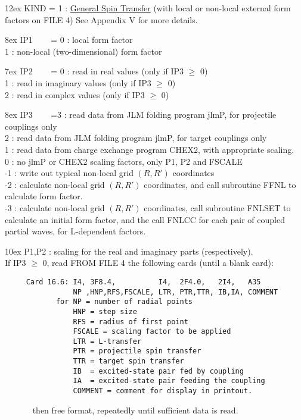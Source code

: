 \documentclass[11pt]{article}
\begin{document}
\hangindent 12ex
KIND = 1 :
\underline{General Spin Transfer}
(with local or non-local external form factors on FILE 4)
See Appendix V for more details.

\hangindent 8ex  IP1
~~~  = 0 : local form factor
\\   1 : non-local (two-dimensional) form factor



\hangindent 7ex  IP2
~~~  = 0 : read in real values      (only if IP3 $\geq$ 0)
\\   1 : read in imaginary values    (only if IP3 $\geq$ 0)
\\   2 : read in complex values        (only if IP3 $\geq$ 0)



\hangindent 8ex  IP3
~~~  =3 : read data from JLM folding program jlmP, for projectile couplings only
\\  2 : read data from JLM folding program jlmP, for target couplings only
\\   1 : read data from charge exchange program CHEX2, with appropriate scaling.
\\   0 : no jlmP or CHEX2 scaling factors, only P1, P2 and FSCALE
\\  -1 : write out typical non-local grid $(R,R')$ coordinates
\\  -2 : calculate non-local grid $(R,R')$ coordinates,
and call subroutine FFNL to calculate form factor.
\\  -3 : calculate non-local grid $(R,R')$ coordinates,
call subroutine FNLSET to calculate an initial form factor, and the call
FNLCC for each pair of coupled partial waves, for L-dependent factors.



\hangindent 10ex
 P1,P2 : scaling for the real and imaginary parts (respectively).\\

   If IP3 $\geq$  0, read FROM FILE 4 the following cards
   (until a blank card):
\begin{verbatim}
     Card 16.6: I4, 3F8.4,          I4,  2F4.0,   2I4,   A35
                NP ,HNP,RFS,FSCALE, LTR, PTR,TTR, IB,IA, COMMENT
            for NP = number of radial points
                HNP = step size
                RFS = radius of first point
                FSCALE = scaling factor to be applied
                LTR = L-transfer
                PTR = projectile spin transfer
                TTR = target spin transfer
                IB  = excited-state pair fed by coupling
                IA  = excited-state pair feeding the coupling
                COMMENT = comment for display in printout.
\end{verbatim}
    ~~~~~~ then free format, repeatedly until sufficient data is read.\\
\end{document}
